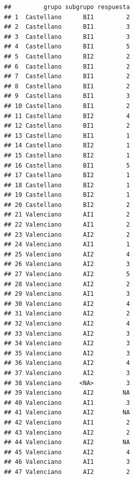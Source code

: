 \documentclass[
]{article}
\begin{document}
\begin{verbatim}
##         grupo subgrupo respuesta
## 1  Castellano      BI1         2
## 2  Castellano      BI1         3
## 3  Castellano      BI1         3
## 4  Castellano      BI1         5
## 5  Castellano      BI2         2
## 6  Castellano      BI1         2
## 7  Castellano      BI1         2
## 8  Castellano      BI1         2
## 9  Castellano      BI1         3
## 10 Castellano      BI1         2
## 11 Castellano      BI2         4
## 12 Castellano      BI1         2
## 13 Castellano      BI1         1
## 14 Castellano      BI2         1
## 15 Castellano      BI2         1
## 16 Castellano      BI1         5
## 17 Castellano      BI2         1
## 18 Castellano      BI2         1
## 19 Castellano      BI2         1
## 20 Castellano      BI2         2
## 21 Valenciano      AI1         2
## 22 Valenciano      AI1         2
## 23 Valenciano      AI2         2
## 24 Valenciano      AI1         1
## 25 Valenciano      AI2         4
## 26 Valenciano      AI2         3
## 27 Valenciano      AI2         5
## 28 Valenciano      AI2         2
## 29 Valenciano      AI1         3
## 30 Valenciano      AI2         4
## 31 Valenciano      AI2         2
## 32 Valenciano      AI2         4
## 33 Valenciano      AI2         3
## 34 Valenciano      AI2         3
## 35 Valenciano      AI2         3
## 36 Valenciano      AI2         4
## 37 Valenciano      AI2         3
## 38 Valenciano     <NA>         3
## 39 Valenciano      AI2        NA
## 40 Valenciano      AI1         3
## 41 Valenciano      AI2        NA
## 42 Valenciano      AI1         2
## 43 Valenciano      AI2         2
## 44 Valenciano      AI2        NA
## 45 Valenciano      AI2         4
## 46 Valenciano      AI1         3
## 47 Valenciano      AI2         2
\end{verbatim}
\end{document}
